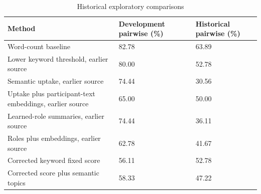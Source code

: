\documentclass[journal,onecolumn]{IEEEtran}
\begin{document}
\begin{table}[htbp]
\centering\footnotesize
\caption{Historical exploratory comparisons}
\setlength{\tabcolsep}{3pt}
\renewcommand{\arraystretch}{1.15}
\begin{tabular}{p{}p{}p{}}
\toprule
{\raggedright Method\par} & {\raggedright Development pairwise (\%)\par} & {\raggedright Historical pairwise (\%)\par} \\
\midrule
{\raggedright Word-count baseline\par} & {\raggedright 82.78\par} & {\raggedright 63.89\par} \\
{\raggedright Lower keyword threshold, earlier source\par} & {\raggedright 80.00\par} & {\raggedright 52.78\par} \\
{\raggedright Semantic uptake, earlier source\par} & {\raggedright 74.44\par} & {\raggedright 30.56\par} \\
{\raggedright Uptake plus participant-text embeddings, earlier source\par} & {\raggedright 65.00\par} & {\raggedright 50.00\par} \\
{\raggedright Learned-role summaries, earlier source\par} & {\raggedright 74.44\par} & {\raggedright 36.11\par} \\
{\raggedright Roles plus embeddings, earlier source\par} & {\raggedright 62.78\par} & {\raggedright 41.67\par} \\
{\raggedright Corrected keyword fixed score\par} & {\raggedright 56.11\par} & {\raggedright 52.78\par} \\
{\raggedright Corrected score plus semantic topics\par} & {\raggedright 58.33\par} & {\raggedright 47.22\par} \\

\end{tabular}
\end{table}
\end{document}
